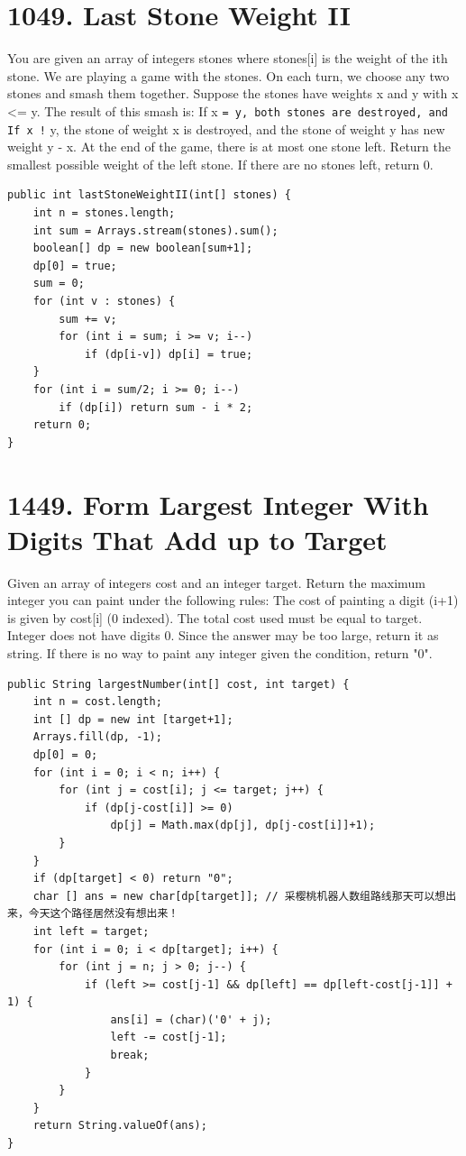 \documentclass[9pt, b5paaper]{book}
\begin{document}
\section{1049. Last Stone Weight II}
\label{sec-1-28}
You are given an array of integers stones where stones[i] is the weight of the ith stone.
We are playing a game with the stones. On each turn, we choose any two stones and smash them together. Suppose the stones have weights x and y with x <= y. The result of this smash is:
If x \texttt{= y, both stones are destroyed, and
If x !} y, the stone of weight x is destroyed, and the stone of weight y has new weight y - x.
At the end of the game, there is at most one stone left.
Return the smallest possible weight of the left stone. If there are no stones left, return 0.
\begin{verbatim}
public int lastStoneWeightII(int[] stones) {
    int n = stones.length;
    int sum = Arrays.stream(stones).sum();
    boolean[] dp = new boolean[sum+1];
    dp[0] = true;
    sum = 0;
    for (int v : stones) {
        sum += v;
        for (int i = sum; i >= v; i--) 
            if (dp[i-v]) dp[i] = true;
    }
    for (int i = sum/2; i >= 0; i--) 
        if (dp[i]) return sum - i * 2;
    return 0;
}
\end{verbatim}

\section{1449. Form Largest Integer With Digits That Add up to Target}
\label{sec-1-29}
Given an array of integers cost and an integer target. Return the maximum integer you can paint under the following rules:
The cost of painting a digit (i+1) is given by cost[i] (0 indexed).
The total cost used must be equal to target.
Integer does not have digits 0.
Since the answer may be too large, return it as string.
If there is no way to paint any integer given the condition, return "0".
\begin{verbatim}
public String largestNumber(int[] cost, int target) { 
    int n = cost.length;
    int [] dp = new int [target+1];
    Arrays.fill(dp, -1);
    dp[0] = 0;
    for (int i = 0; i < n; i++) {
        for (int j = cost[i]; j <= target; j++) {
            if (dp[j-cost[i]] >= 0)
                dp[j] = Math.max(dp[j], dp[j-cost[i]]+1);
        }
    }
    if (dp[target] < 0) return "0";
    char [] ans = new char[dp[target]]; // 采樱桃机器人数组路线那天可以想出来，今天这个路径居然没有想出来！
    int left = target;
    for (int i = 0; i < dp[target]; i++) {
        for (int j = n; j > 0; j--) {
            if (left >= cost[j-1] && dp[left] == dp[left-cost[j-1]] + 1) {
                ans[i] = (char)('0' + j);
                left -= cost[j-1];
                break;
            }
        }
    }
    return String.valueOf(ans);
}
\end{verbatim}
\end{document}
